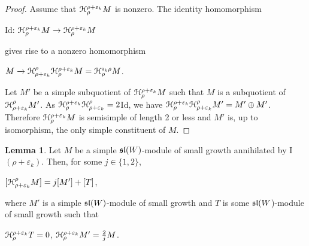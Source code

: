 \documentclass[12pt]{amsart}
\theoremstyle{definition}\newtheorem{theorem}{Theorem}[section]
\newtheorem{lemma}[proposition]{Lemma}
\theoremstyle{definition}\newtheorem{definition}[proposition]{Definition}
\theoremstyle{remark}\newtheorem{example}[proposition]{Example}
\renewcommand{\to}[1][]{\xrightarrow{#1}}
\begin{document}
\begin{proof} Assume that $\EuScript H_\rho^{\rho+\varepsilon_k}M$ is nonzero. The identity homomorphism \begin{center}Id: $ \EuScript H_\rho^{\rho+\varepsilon_k}M\to\EuScript H_\rho^{\rho+\varepsilon_k}M$\end{center} gives rise to a nonzero homomorphism\begin{center}$M\to \EuScript H^\rho_{\rho+\varepsilon_k}\EuScript H_\rho^{\rho+\varepsilon_k}M=\EuScript H_\rho^{\mathrm s_k\rho}M$.\end{center}Let $M'$ be a simple subquotient of $\EuScript H_\rho^{\rho+\varepsilon_k}M$ such that $M$ is a subquotient of $\EuScript H^\rho_{\rho+\varepsilon_k}M'$. As $\EuScript H_\rho^{\rho+\varepsilon_k}\EuScript H^\rho_{\rho+\varepsilon_k}=2$Id, we have $\EuScript H_\rho^{\rho+\varepsilon_k}\EuScript H^\rho_{\rho+\varepsilon_k}M'=M'\oplus M'$. Therefore $\EuScript H_\rho^{\rho+\varepsilon_k}M$ is semisimple of length 2 or less and $M'$ is, up to isomorphism, the only simple constituent of $M$.\end{proof}
\begin{lemma} Let $M$ be a simple $\frak{sl}(W)$-module of small growth annihilated by I$(\rho+\varepsilon_k)$. Then, for some $j\in\{1, 2\}$,\begin{center}$[\EuScript H^\rho_{\rho+\varepsilon_k}M]=j[M']+[T]$,\end{center} where $M'$ is a simple $\frak{sl}(W)$-module of small growth and $T$ is some $\frak{sl}(W$)-module of small growth such that \begin{center}$\EuScript H_\rho^{\rho+\varepsilon_k}T=0$, $\EuScript H_\rho^{\rho+\varepsilon_k}M'=\frac{2}{j}M$.\end{center}\end{lemma}
\end{document}
